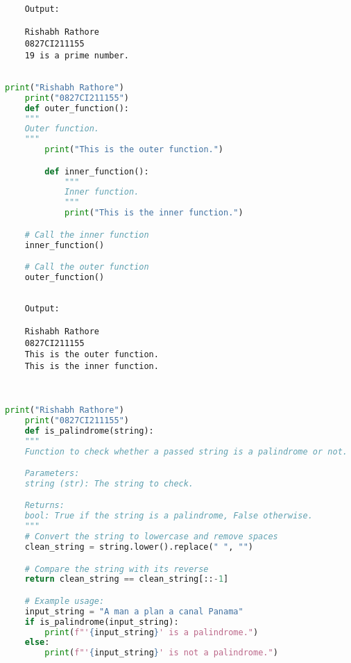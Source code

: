 \documentclass{report}
\begin{document}
\begin{verbatim}
	Output:

	Rishabh Rathore
	0827CI211155
	19 is a prime number.
	

\end{verbatim}


\bigskip


\sol 
\begin{lstlisting}[language=Python]
	print("Rishabh Rathore")
	print("0827CI211155")
	def outer_function():
    """
    Outer function.
    """
		print("This is the outer function.")

		def inner_function():
			"""
			Inner function.
			"""
			print("This is the inner function.")

    # Call the inner function
    inner_function()

	# Call the outer function
	outer_function()
  

\end{lstlisting}

\begin{verbatim}
	Output:

	Rishabh Rathore
	0827CI211155
	This is the outer function.
	This is the inner function.
	
	

\end{verbatim}


\bigskip


\sol 
\begin{lstlisting}[language=Python]
	print("Rishabh Rathore")
	print("0827CI211155")
	def is_palindrome(string):
    """
    Function to check whether a passed string is a palindrome or not.

    Parameters:
    string (str): The string to check.

    Returns:
    bool: True if the string is a palindrome, False otherwise.
    """
    # Convert the string to lowercase and remove spaces
    clean_string = string.lower().replace(" ", "")

    # Compare the string with its reverse
    return clean_string == clean_string[::-1]

	# Example usage:
	input_string = "A man a plan a canal Panama"
	if is_palindrome(input_string):
		print(f"'{input_string}' is a palindrome.")
	else:
		print(f"'{input_string}' is not a palindrome.")
  

\end{lstlisting}
\end{document}
